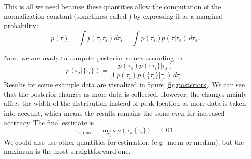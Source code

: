 \begin{ex}
This is all we need because these quantities allow the computation of the normalization constant (sometimes called ) by expressing it as a marginal probability\footnotemark:
\begin{equation*}
p(\tau) = \int p(\tau, \tau_s) d\tau_s = \int p(\tau_s) p(\tau | \tau_s) \, d\tau_s \, .
\end{equation*}


Now, we are ready to compute posterior values according to
\begin{equation*}
p(\tau_s | \{\tau_i\}) = \frac{p(\tau_s) p(\{\tau_i\} | \tau_s)}{\int p(\tau_s) p(\{\tau_i\} | \tau_s) \, d\tau_s} \, .
\end{equation*}
Results for some example data are visualized in figure \ref{fig:posteriors}. We can see that the posterior changes as more data is collected. However, the changes mainly affect the width of the distribution instead of peak location as more data is taken into account, which means the results remains the same even for increased accuracy. The final estimate is
\begin{equation*}
\tau_{s, \text{max}} = \max_{\tau_s} p(\tau_s | \{\tau_i\}) = 4.01 \, .
\end{equation*}
We could also use other quantities for estimation (e.g.~mean or median), but the maximum is the most straightforward one.
\end{ex}


